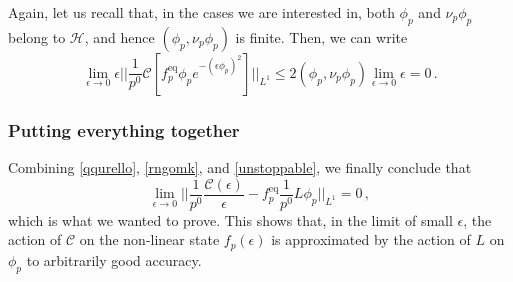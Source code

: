 \documentclass[a4paper, amsfonts, amssymb, amsmath, reprint, showkeys, nofootinbib, twoside, onecolumn,notitlepage,,longbibliography]{revtex4-2}
\theoremstyle{definition}
\theoremstyle{theorem}
\theoremstyle{corollary}
\begin{document}
Again, let us recall that, in the cases we are interested in, both $\phi_p$ and $\nu_p \phi_p$ belong to $\mathcal{H}$, and hence $(\phi_p,\nu_p\phi_p)$ is finite. Then, we can write
\begin{equation}\label{unstoppable}
\lim_{\epsilon \rightarrow 0} \epsilon \bigg| \bigg| \dfrac{1}{p^0} \mathcal{C}[f_p^{\text{eq}}\phi_p e^{-(\epsilon\phi_p)^2}] \bigg| \bigg|_{L^1} \leq 2(\phi_p,\nu_p\phi_p) \lim_{\epsilon \rightarrow 0} \epsilon  =0 \, . 
\end{equation}

\subsubsection{Putting everything together}

Combining \eqref{qqurello}, \eqref{rngomk}, and \eqref{unstoppable}, we finally conclude that
\begin{equation}
\lim_{\epsilon \rightarrow 0} \bigg|\bigg| \dfrac{1}{p^0} \dfrac{\mathcal{C}(\epsilon)}{\epsilon} - f^{\text{eq}}_p \dfrac{1}{p^0} L\phi_p \bigg| \bigg|_{L^1}  = 0 \, ,   
\end{equation}
which is what we wanted to prove. This shows that, in the limit of small $\epsilon$, the action of $\mathcal{C}$ on the non-linear state $f_p(\epsilon)$ is approximated by the action of $L$ on $\phi_p$ to arbitrarily good accuracy.




\label{lastpage}
\end{document}
